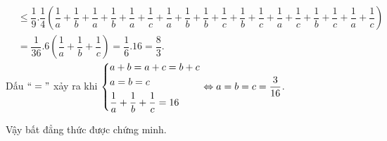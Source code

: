 \begin{ex}
{\begin{enumerate}
\begin{align*}
&\le \dfrac{1}{9}.\dfrac{1}{4} \left( \dfrac{1}{a}+\dfrac{1}{b}+\dfrac{1}{a}+\dfrac{1}{b}+\dfrac{1}{a}+\dfrac{1}{c}+\dfrac{1}{a}+\dfrac{1}{b}+\dfrac{1}{b}+\dfrac{1}{c}+\dfrac{1}{b}+\dfrac{1}{c}+\dfrac{1}{a}+\dfrac{1}{c}+\dfrac{1}{b}+\dfrac{1}{c}+\dfrac{1}{a}+\dfrac{1}{c} \right)\\
&=\dfrac{1}{36}.6 \left(\dfrac{1}{a}+\dfrac{1}{b}+\dfrac{1}{c} \right) = \dfrac{1}{6}.16=\dfrac{8}{3}.
\end{align*}
Dấu $``="$ xảy ra khi $\left\{\begin{aligned}&a+b=a+c=b+c\\&a=b=c\\&\dfrac{1}{a}+\dfrac{1}{b}+\dfrac{1}{c}=16\end{aligned}\right. \Leftrightarrow a=b=c=\dfrac{3}{16}$.
\par Vậy bất đẳng thức được chứng minh.
\end{enumerate}
}
\end{ex}
